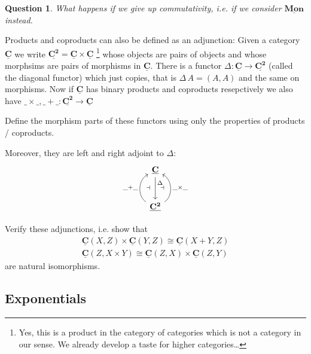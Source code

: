 \documentclass{article}
\newcommand{\cat}[1]{\underline{\mathbf{#1}}}
\newtheorem{question}[Exercise]{Question}
\begin{document}
\begin{question}
  What happens if we give up commutativity, i.e. if we consider $\cat{Mon}$ instead.
\end{question}

Products and coproducts can also be defined as an adjunction: Given a category $\cat{C}$ we write $\cat{C^2} = \cat{C}\times\cat{C}$
\footnote{Yes, this is a product in the category of categories which is not a category in our sense. We already develop a taste for higher categories\dots}
whose objects are pairs of objects and whose morphsims are pairs of morphisms in $\cat{C}$. There is a functor $\Delta : \cat{C} \to \cat{C^2}$ (called the diagonal functor) which just copies, that is $\Delta\,A = (A,A)$ and the same on morphisms. Now if $\cat{C}$ has binary products and coproducts resepctively we also have $\_\times\_, \_+\_ : \cat{C^2} \to \cat{C}$
\begin{Exercise}
  Define the morphism parts of these functors using only the properties of products / coproducts.
\end{Exercise}
Moreover, they are left and right adjoint to $\Delta$:
\[\begin{tikzcd}[row sep=large]
\cat{C} \arrow[d,"\Delta" near start] \\ 
\cat{C^2} \arrow[u,bend left = 60,"\_+\_" left,"\dashv" right=5 ] \arrow[u,bend right = 60,"\_\times\_" right,"\dashv" left = 5]
\end{tikzcd}\]
\begin{Exercise}
  Verify these adjunctions, i.e. show that
  \begin{align*}
    \cat{C}(X,Z) \times \cat{C}(Y,Z) \cong \cat{C}(X + Y,Z) \\
    \cat{C}(Z, X\times Y) \cong \cat{C}(Z,X) \times \cat{C}(Z,Y)
  \end{align*}
  are natural isomorphisms. 
\end{Exercise}

\subsection{Exponentials}
\label{sec:exponentials}
\end{document}
